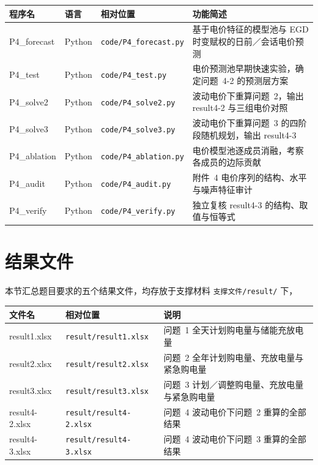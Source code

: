 \documentclass[zihao=-4,a4paper,fontset=none]{ctexart}
\begin{document}
\noindent\begin{minipage}{\textwidth}
\centering
{}\label{tab:codeP4}
{\footnotesize
\begin{tabular}{@{}p{2.4cm}p{0.9cm}p{3.7cm}p{6.4cm}@{}}
\toprule
程序名 & 语言 & 相对位置 & 功能简述 \\
\midrule
P4\_forecast & Python & \texttt{code/P4\_forecast.py} & 基于电价特征的模型池与 EGD 时变赋权的日前／会话电价预测 \\
P4\_test & Python & \texttt{code/P4\_test.py} & 电价预测池早期快速实验，确定问题~4-2 的预测层方案 \\
P4\_solve2 & Python & \texttt{code/P4\_solve2.py} & 波动电价下重算问题~2，输出 result4-2 与三组电价对照 \\
P4\_solve3 & Python & \texttt{code/P4\_solve3.py} & 波动电价下重算问题~3 的四阶段随机规划，输出 result4-3 \\
P4\_ablation & Python & \texttt{code/P4\_ablation.py} & 电价模型池逐成员消融，考察各成员的边际贡献 \\
P4\_audit & Python & \texttt{code/P4\_audit.py} & 附件~4 电价序列的结构、水平与噪声特征审计 \\
P4\_verify & Python & \texttt{code/P4\_verify.py} & 独立复核 result4-3 的结构、取值与恒等式 \\
\bottomrule
\end{tabular}}
\end{minipage}

\section{结果文件}

本节汇总题目要求的五个结果文件，均存放于支撑材料 \texttt{支撑文件/result/} 下，

\noindent\begin{minipage}{\textwidth}
\centering
{}\label{tab:results}
{\footnotesize
\begin{tabular}{@{}p{3.0cm}p{3.7cm}p{8.3cm}@{}}
\toprule
文件名 & 相对位置 & 说明 \\
\midrule
result1.xlsx & \texttt{result/result1.xlsx} & 问题~1 全天计划购电量与储能充放电量 \\
result2.xlsx & \texttt{result/result2.xlsx} & 问题~2 全年计划购电量、充放电量与紧急购电量 \\
result3.xlsx & \texttt{result/result3.xlsx} & 问题~3 计划／调整购电量、充放电量与紧急购电量 \\
result4-2.xlsx & \texttt{result/result4-2.xlsx} & 问题~4 波动电价下问题~2 重算的全部结果 \\
result4-3.xlsx & \texttt{result/result4-3.xlsx} & 问题~4 波动电价下问题~3 重算的全部结果 \\
\bottomrule
\end{tabular}}
\end{minipage}
\end{document}
